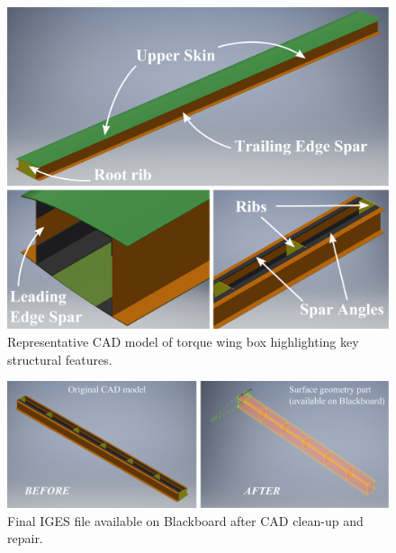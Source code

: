 \documentclass[11pt,a4paper,oneside]{memoir}
\begin{document}
\begin{figure}
  \begin{center}
  \includegraphics[width=\textwidth]{wing-cad-model-2018.pdf}
  \caption{Representative CAD model of torque wing box highlighting key structural features.}
  \label{fig:wing-cad-model}
  \end{center}
\end{figure}
%
\begin{figure}[t]
  \begin{center}
  \includegraphics[width=1\textwidth]{wing-cad-model-cleanup.pdf}
  \caption{Final IGES file available on Blackboard after CAD clean-up and repair.}
  \label{fig:wing-cad-model-cleanup}
  \end{center}
\end{figure}
\end{document}
